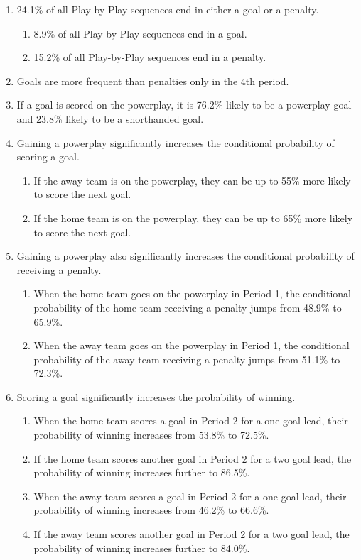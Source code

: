 \documentclass[]{article}
\begin{document}
\begin{enumerate}
\item 24.1\% of all Play-by-Play sequences end in either a goal or a penalty.
\begin{enumerate}
\item 8.9\% of all Play-by-Play sequences end in a goal.
\item 15.2\% of all Play-by-Play sequences end in a penalty.
\end{enumerate}
\item Goals are more frequent than penalties only in the 4th period.
\item If a goal is scored on the powerplay, it is 76.2\% likely to be a powerplay goal and 23.8\% likely to be a shorthanded goal.
\item Gaining a powerplay significantly increases the conditional probability of scoring a goal.
\begin{enumerate}
\item If the away team is on the powerplay, they can be up to 55\% more likely to score the next goal.
\item If the home team is on the powerplay, they can be up to 65\% more likely to score the next goal.
\end{enumerate}
\item Gaining a powerplay also significantly increases the conditional probability of receiving a penalty.
\begin{enumerate}
\item When the home team goes on the powerplay in Period 1, the conditional probability of the home team receiving a penalty jumps from 48.9\% to 65.9\%.
\item When the away team goes on the powerplay in Period 1, the conditional probability of the away team receiving a penalty jumps from 51.1\% to 72.3\%.
\end{enumerate}
\item Scoring a goal significantly increases the probability of winning.
\begin{enumerate}
\item When the home team scores a goal in Period 2 for a one goal lead, their probability of winning increases from 53.8\% to 72.5\%.
\item If the home team scores another goal in Period 2 for a two goal lead, the probability of winning increases further to 86.5\%.
\item When the away team scores a goal in Period 2 for a one goal lead, their probability of winning increases from 46.2\% to 66.6\%.
\item If the away team scores another goal in Period 2 for a two goal lead, the probability of winning increases further to 84.0\%.
\end{enumerate}
\end{enumerate}
\end{document}
